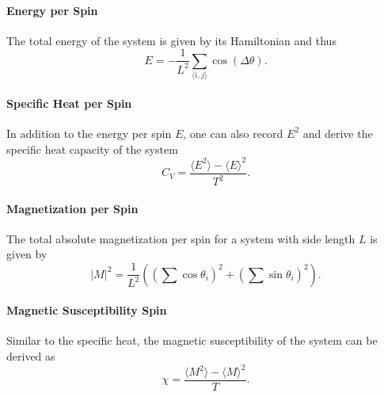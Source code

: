 		\paragraph{Energy per Spin}
			The total energy of the system is given by its Hamiltonian and thus
			\begin{equation}\label{eq:energy}
				E = - \frac{1}{L^2} \sum_{\langle i, j \rangle}{\cos(\Delta \theta)}.
			\end{equation}
		
		\paragraph{Specific Heat per Spin}
			In addition to the energy per spin $E$, one can also record $E^2$ and derive the specific heat capacity of the system
			\begin{equation}\label{eq:specific_heat}
				C_V = \frac{\langle E^2 \rangle - \langle E \rangle^2}{T^2}.
			\end{equation}
		
		\paragraph{Magnetization per Spin}
			The total absolute magnetization per spin for a system with side length $L$ is given by
			\begin{equation}\label{eq:magnetization}
				\lvert M \rvert^2 = \frac{1}{L^2} \left( (\sum{\cos\theta_i})^2 + (\sum{\sin\theta_i})^2 \right).
			\end{equation}
		
		\paragraph{Magnetic Susceptibility Spin}
			Similar to the specific heat, the magnetic susceptibility of the system can be derived as
			\begin{equation}\label{eq:magnetic_suceptibility}
				\chi = \frac{\langle M^2 \rangle - \langle M \rangle^2}{T}.
			\end{equation}
		
